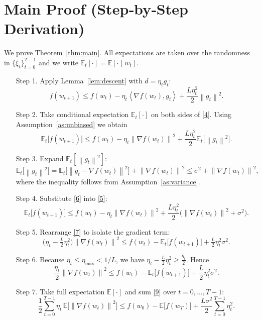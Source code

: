 \documentclass[11pt]{article}
\newcommand{\EE}{\mathbb{E}}
\newcommand{\norm}[1]{\left\lVert #1 \right\rVert}
\newcommand{\inner}[2]{\left\langle #1,#2 \right\rangle}
\begin{document}
\section*{Main Proof (Step‑by‑Step Derivation)}
We prove Theorem~\ref{thm:main}.  All expectations are taken over the randomness
in $\{\xi_t\}_{t=0}^{T-1}$ and we write $\EE_t[\cdot]=\EE[\cdot\mid w_t]$.

\begin{enumerate}
\item[Step 1.] Apply Lemma~\ref{lem:descent} with $d=\eta_t g_t$:
\[
f(w_{t+1})\le f(w_t)-\eta_t\inner{\nabla f(w_t)}{g_t}
                +\frac{L\eta_t^{2}}{2}\norm{g_t}^{2}. \tag{4}
\]

\item[Step 2.] Take conditional expectation $\EE_t[\cdot]$ on both sides of \eqref{4}.
Using Assumption~\ref{as:unbiased} we obtain
\[
\EE_t\!\bigl[f(w_{t+1})\bigr]
\le f(w_t)-\eta_t \norm{\nabla f(w_t)}^{2}
   +\frac{L\eta_t^{2}}{2}\EE_t\!\bigl[\norm{g_t}^{2}\bigr]. \tag{5}
\]

\item[Step 3.] Expand $\EE_t[\norm{g_t}^{2}]$:
\[
\EE_t\!\bigl[\norm{g_t}^{2}\bigr]
= \EE_t\!\bigl[\norm{g_t-\nabla f(w_t)}^{2}\bigr]
  +\norm{\nabla f(w_t)}^{2}
\le \sigma^{2}+\norm{\nabla f(w_t)}^{2}, \tag{6}
\]
where the inequality follows from Assumption~\ref{as:variance}.

\item[Step 4.] Substitute \eqref{6} into \eqref{5}:
\[
\EE_t\!\bigl[f(w_{t+1})\bigr]
\le f(w_t)-\eta_t \norm{\nabla f(w_t)}^{2}
   +\frac{L\eta_t^{2}}{2}\bigl(\norm{\nabla f(w_t)}^{2}+\sigma^{2}\bigr). \tag{7}
\]

\item[Step 5.] Rearrange \eqref{7} to isolate the gradient term:
\[
\bigl(\eta_t-\tfrac{L}{2}\eta_t^{2}\bigr)\norm{\nabla f(w_t)}^{2}
\le f(w_t)-\EE_t\!\bigl[f(w_{t+1})\bigr]
   +\tfrac{L}{2}\eta_t^{2}\sigma^{2}. \tag{8}
\]

\item[Step 6.] Because $\eta_t\le\eta_{\max}<1/L$, we have
$\eta_t-\frac{L}{2}\eta_t^{2}\ge \frac{\eta_t}{2}$.  Hence
\[
\frac{\eta_t}{2}\norm{\nabla f(w_t)}^{2}
\le f(w_t)-\EE_t\!\bigl[f(w_{t+1})\bigr]
   +\frac{L}{2}\eta_t^{2}\sigma^{2}. \tag{9}
\]

\item[Step 7.] Take full expectation $\EE[\cdot]$ and sum \eqref{9} over $t=0,\dots,T-1$:
\[
\frac12\sum_{t=0}^{T-1}\eta_t\,
      \EE\!\bigl[\norm{\nabla f(w_t)}^{2}\bigr]
\le f(w_0)-\EE\!\bigl[f(w_T)\bigr]
   +\frac{L\sigma^{2}}{2}\sum_{t=0}^{T-1}\eta_t^{2}. \tag{10}
\]


\end{enumerate}
\end{document}
